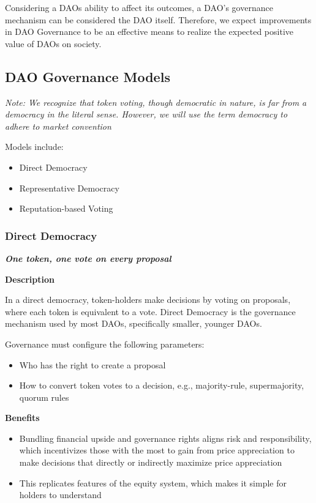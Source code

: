 \documentclass[
]{article}
\providecommand{\tightlist}{%
  \setlength{\itemsep}{0pt}\setlength{\parskip}{0pt}}
\begin{document}
Considering a DAOs ability to affect its outcomes, a DAO's governance
mechanism can be considered the DAO itself. Therefore, we expect
improvements in DAO Governance to be an effective means to realize the
expected positive value of DAOs on society.

\hypertarget{dao-governance-models}{%
\subsection{DAO Governance Models}\label{dao-governance-models}}

\emph{Note: We recognize that token voting, though democratic in nature,
is far from a democracy in the literal sense. However, we will use the
term democracy to adhere to market convention}

Models include:

\begin{itemize}
\tightlist
\item
  Direct Democracy
\item
  Representative Democracy
\item
  Reputation-based Voting
\end{itemize}

\hypertarget{direct-democracy}{%
\subsubsection{Direct Democracy}\label{direct-democracy}}

\textbf{\emph{One token, one vote on every proposal}}

\textbf{Description}

In a direct democracy, token-holders make decisions by voting on
proposals, where each token is equivalent to a vote. Direct Democracy is
the governance mechanism used by most DAOs, specifically smaller,
younger DAOs.

Governance must configure the following parameters:

\begin{itemize}
\tightlist
\item
  Who has the right to create a proposal
\item
  How to convert token votes to a decision, e.g., majority-rule,
  supermajority, quorum rules
\end{itemize}

\textbf{Benefits}

\begin{itemize}
\tightlist
\item
  Bundling financial upside and governance rights aligns risk and
  responsibility, which incentivizes those with the most to gain from
  price appreciation to make decisions that directly or indirectly
  maximize price appreciation
\item
  This replicates features of the equity system, which makes it simple
  for holders to understand
\end{itemize}
\end{document}
